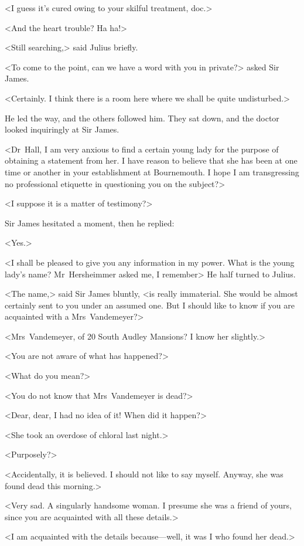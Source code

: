 <I guess it's cured owing to your skilful treatment, doc.>

<And the heart trouble? Ha ha!>

<Still searching,> said Julius briefly.

<To come to the point, can we have a word with you in private?> asked Sir James.

<Certainly. I think there is a room here where we shall be quite undisturbed.>

He led the way, and the others followed him. They sat down, and the doctor looked inquiringly at Sir James.

<Dr~Hall, I am very anxious to find a certain young lady for the purpose of obtaining a statement from her. I have reason to believe that she has been at one time or another in your establishment at Bournemouth. I hope I am transgressing no professional etiquette in questioning you on the subject?>

<I suppose it is a matter of testimony?>

Sir James hesitated a moment, then he replied:

<Yes.>

<I shall be pleased to give you any information in my power. What is the young lady's name? Mr~Hersheimmer asked me, I remember\longdash> He half turned to Julius.

<The name,> said Sir James bluntly, <is really immaterial. She would be almost certainly sent to you under an assumed one. But I should like to know if you are acquainted with a Mrs~Vandemeyer?>

<Mrs~Vandemeyer, of 20 South Audley Mansions? I know her slightly.>

<You are not aware of what has happened?>

<What do you mean?>

<You do not know that Mrs~Vandemeyer is dead?>

<Dear, dear, I had no idea of it! When did it happen?>

<She took an overdose of chloral last night.>

<Purposely?>

<Accidentally, it is believed. I should not like to say myself. Anyway, she was found dead this morning.>

<Very sad. A singularly handsome woman. I presume she was a friend of yours, since you are acquainted with all these details.>

<I am acquainted with the details because—well, it was I who found her dead.>

